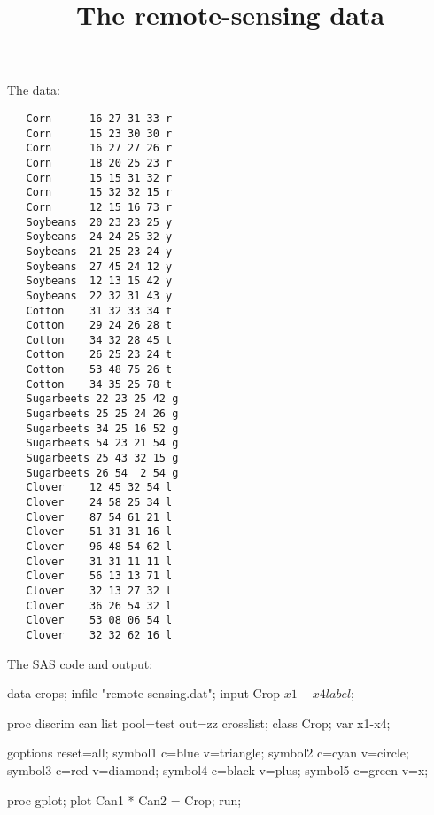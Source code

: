 \documentclass{article}
\title{The remote-sensing data}
\begin{document}
\maketitle
The data:
\begin{verbatim}
   Corn      16 27 31 33 r
   Corn      15 23 30 30 r
   Corn      16 27 27 26 r
   Corn      18 20 25 23 r
   Corn      15 15 31 32 r
   Corn      15 32 32 15 r
   Corn      12 15 16 73 r
   Soybeans  20 23 23 25 y
   Soybeans  24 24 25 32 y
   Soybeans  21 25 23 24 y
   Soybeans  27 45 24 12 y
   Soybeans  12 13 15 42 y
   Soybeans  22 32 31 43 y
   Cotton    31 32 33 34 t
   Cotton    29 24 26 28 t
   Cotton    34 32 28 45 t
   Cotton    26 25 23 24 t
   Cotton    53 48 75 26 t
   Cotton    34 35 25 78 t
   Sugarbeets 22 23 25 42 g
   Sugarbeets 25 25 24 26 g
   Sugarbeets 34 25 16 52 g
   Sugarbeets 54 23 21 54 g
   Sugarbeets 25 43 32 15 g
   Sugarbeets 26 54  2 54 g
   Clover    12 45 32 54 l
   Clover    24 58 25 34 l
   Clover    87 54 61 21 l
   Clover    51 31 31 16 l
   Clover    96 48 54 62 l
   Clover    31 31 11 11 l
   Clover    56 13 13 71 l
   Clover    32 13 27 32 l
   Clover    36 26 54 32 l
   Clover    53 08 06 54 l
   Clover    32 32 62 16 l
\end{verbatim}
The SAS code and output:
\begin{Winput}
data crops;
    infile "remote-sensing.dat";
    input Crop $ x1-x4 label $;
    
proc discrim can list pool=test out=zz crosslist;
    class Crop;
    var x1-x4;

goptions reset=all;
symbol1 c=blue v=triangle;
symbol2 c=cyan v=circle;
symbol3 c=red v=diamond;
symbol4 c=black v=plus;
symbol5 c=green v=x;

proc gplot;
plot Can1 * Can2 = Crop;
run;
\end{Winput}
\end{document}
